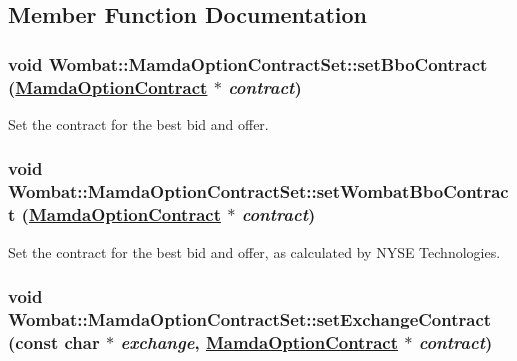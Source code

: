 \subsection{Member Function Documentation}
\hypertarget{classWombat_1_1MamdaOptionContractSet_d5ed4d66ce4e34d8b143245cb5ca6473}{
\subsubsection[setBboContract]{\setlength{\rightskip}{0pt plus 5cm}void Wombat::Mamda\-Option\-Contract\-Set::set\-Bbo\-Contract (\hyperlink{classWombat_1_1MamdaOptionContract}{Mamda\-Option\-Contract} $\ast$ {\em contract})}}
\label{classWombat_1_1MamdaOptionContractSet_d5ed4d66ce4e34d8b143245cb5ca6473}


Set the contract for the best bid and offer. 

\hypertarget{classWombat_1_1MamdaOptionContractSet_360ce213c19a6db9d21e0a63fe8b78f8}{
\subsubsection[setWombatBboContract]{\setlength{\rightskip}{0pt plus 5cm}void Wombat::Mamda\-Option\-Contract\-Set::set\-Wombat\-Bbo\-Contract (\hyperlink{classWombat_1_1MamdaOptionContract}{Mamda\-Option\-Contract} $\ast$ {\em contract})}}
\label{classWombat_1_1MamdaOptionContractSet_360ce213c19a6db9d21e0a63fe8b78f8}


Set the contract for the best bid and offer, as calculated by NYSE Technologies. 

\hypertarget{classWombat_1_1MamdaOptionContractSet_03643ebac542997c30111732754c485c}{
\subsubsection[setExchangeContract]{\setlength{\rightskip}{0pt plus 5cm}void Wombat::Mamda\-Option\-Contract\-Set::set\-Exchange\-Contract (const char $\ast$ {\em exchange}, \hyperlink{classWombat_1_1MamdaOptionContract}{Mamda\-Option\-Contract} $\ast$ {\em contract})}}
\label{classWombat_1_1MamdaOptionContractSet_03643ebac542997c30111732754c485c}


